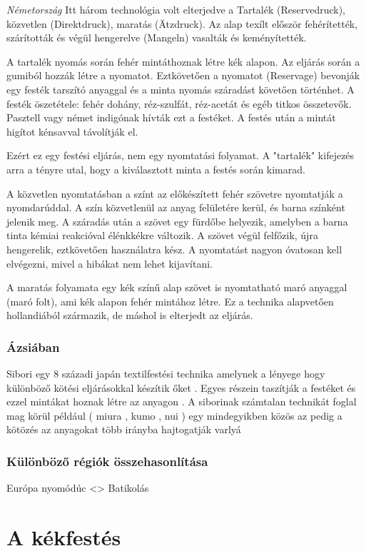 \documentclass[fontsize=12pt, appendixprefix=true]{scrreprt}
\begin{document}
\textit{Németország} 
Itt három technológia volt elterjedve a Tartalék (Reservedruck), közvetlen (Direktdruck), maratás (Ätzdruck). Az alap texílt először fehérítették, szárították és végül hengerelve (Mangeln) vasalták és keményítették.

A tartalék nyomás során fehér mintáthoznak létre kék alapon. Az eljárás során a gumiból hozzák létre a nyomatot. Eztkövetően a nyomatot (Reservage) bevonják egy festék tarszító anyaggal és a minta nyomás száradást követően történhet. A festék öszetétele: fehér dohány, réz-szulfát, réz-acetát és egéb titkos összetevők. Pasztell vagy német indigónak hívták ezt a festéket. A festés után a mintát higítot kénsavval távolítják el.

Ezért ez egy festési eljárás, nem egy nyomtatási folyamat. A "tartalék" kifejezés arra a tényre utal, hogy a kiválasztott minta a festés során kimarad.

A közvetlen nyomtatásban a színt az előkészített fehér szövetre nyomtatják a nyomdarúddal. A szín közvetlenül az anyag felületére kerül, és barna színként jelenik meg. A száradás után a szövet egy fürdőbe helyezik, amelyben a barna tinta kémiai reakcióval élénkkékre változik. A szövet végül felfőzik, újra hengerelik, eztkövetően használatra kész. A nyomtatást nagyon óvatosan kell elvégezni, mivel a hibákat nem lehet kijavítani.

A maratás folyamata egy kék színű alap szövet is nyomtatható maró anyaggal (maró folt), ami kék alapon fehér mintához létre. Ez a technika alapvetően hollandiából származik, de máshol is elterjedt az eljárás.


\subsection{Ázsiában}
Sibori egy 8 századi japán textilfestési technika amelynek a lényege hogy különböző kötési eljárásokkal készítik őket .
Egyes részein taszítják a festéket és ezzel mintákat hoznak létre az anyagon .
A siborinak számtalan technikát foglal mag körül   például ( miura , kumo  , nui  ) egy mindegyikben közös az pedig a kötözés az anyagokat több irányba hajtogatják 
varlyá


\subsection{Különböző régiók összehasonlítása}
   Európa nyomódúc <> Batikolás

\chapter{A kékfestés}
\end{document}
